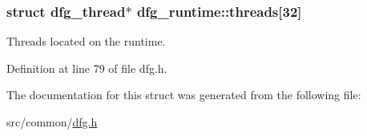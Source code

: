 \hypertarget{structdfg__runtime_a4b28fe6113c7edf2f4defb4edee42078}{
\subsubsection[{threads}]{\setlength{\rightskip}{0pt plus 5cm}struct {\bf dfg\-\_\-thread}$\ast$ dfg\-\_\-runtime\-::threads\mbox{[}32\mbox{]}}}\label{structdfg__runtime_a4b28fe6113c7edf2f4defb4edee42078}


Threads located on the runtime. 



Definition at line 79 of file dfg.\-h.



The documentation for this struct was generated from the following file\-:\begin{DoxyCompactItemize}
\item 
src/common/\hyperlink{dfg_8h}{dfg.\-h}\end{DoxyCompactItemize}
